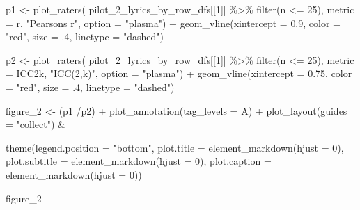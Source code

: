 \documentclass[
  man]{apa7}
\newenvironment{Shaded}{\begin{snugshade}}{\end{snugshade}}
\newcommand{\AttributeTok}[1]{\textcolor[rgb]{0.40,0.45,0.13}{#1}}
\newcommand{\DecValTok}[1]{\textcolor[rgb]{0.68,0.00,0.00}{#1}}
\newcommand{\FloatTok}[1]{\textcolor[rgb]{0.68,0.00,0.00}{#1}}
\newcommand{\FunctionTok}[1]{\textcolor[rgb]{0.28,0.35,0.67}{#1}}
\newcommand{\NormalTok}[1]{\textcolor[rgb]{0.00,0.23,0.31}{#1}}
\newcommand{\OtherTok}[1]{\textcolor[rgb]{0.00,0.23,0.31}{#1}}
\newcommand{\SpecialCharTok}[1]{\textcolor[rgb]{0.37,0.37,0.37}{#1}}
\newcommand{\StringTok}[1]{\textcolor[rgb]{0.13,0.47,0.30}{#1}}
\begin{document}
\begin{Shaded}
\begin{Highlighting}[]
\NormalTok{p1 }\OtherTok{\textless{}{-}} \FunctionTok{plot\_raters}\NormalTok{(}
\NormalTok{  pilot\_2\_lyrics\_by\_row\_dfs[[}\DecValTok{1}\NormalTok{]] }\SpecialCharTok{\%\textgreater{}\%} \FunctionTok{filter}\NormalTok{(n }\SpecialCharTok{\textless{}=} \DecValTok{25}\NormalTok{), }
  \AttributeTok{metric =}\NormalTok{ r, }\StringTok{"Pearson\textquotesingle{}s r"}\NormalTok{, }\AttributeTok{option =} \StringTok{"plasma"}\NormalTok{) }\SpecialCharTok{+} 
  \FunctionTok{geom\_vline}\NormalTok{(}\AttributeTok{xintercept =} \FloatTok{0.9}\NormalTok{, }\AttributeTok{color =} \StringTok{"red"}\NormalTok{, }\AttributeTok{size =}\NormalTok{ .}\DecValTok{4}\NormalTok{, }\AttributeTok{linetype =} \StringTok{"dashed"}\NormalTok{) }

\NormalTok{p2 }\OtherTok{\textless{}{-}} \FunctionTok{plot\_raters}\NormalTok{(}
\NormalTok{  pilot\_2\_lyrics\_by\_row\_dfs[[}\DecValTok{1}\NormalTok{]] }\SpecialCharTok{\%\textgreater{}\%} \FunctionTok{filter}\NormalTok{(n }\SpecialCharTok{\textless{}=} \DecValTok{25}\NormalTok{), }
  \AttributeTok{metric =}\NormalTok{ ICC2k, }\StringTok{"ICC(2,k)"}\NormalTok{, }\AttributeTok{option =} \StringTok{"plasma"}\NormalTok{) }\SpecialCharTok{+}
  \FunctionTok{geom\_vline}\NormalTok{(}\AttributeTok{xintercept =} \FloatTok{0.75}\NormalTok{, }\AttributeTok{color =} \StringTok{"red"}\NormalTok{, }\AttributeTok{size =}\NormalTok{ .}\DecValTok{4}\NormalTok{, }\AttributeTok{linetype =} \StringTok{"dashed"}\NormalTok{) }

\NormalTok{figure\_2 }\OtherTok{\textless{}{-}}\NormalTok{ (p1 }\SpecialCharTok{/}\NormalTok{p2) }\SpecialCharTok{+} 
  \FunctionTok{plot\_annotation}\NormalTok{(}\AttributeTok{tag\_levels =} \StringTok{\textquotesingle{}A\textquotesingle{}}\NormalTok{) }\SpecialCharTok{+}
  \FunctionTok{plot\_layout}\NormalTok{(}\AttributeTok{guides =} \StringTok{"collect"}\NormalTok{) }\SpecialCharTok{\&}
  
  \FunctionTok{theme}\NormalTok{(}\AttributeTok{legend.position =} \StringTok{"bottom"}\NormalTok{,}
        \AttributeTok{plot.title =} \FunctionTok{element\_markdown}\NormalTok{(}\AttributeTok{hjust =} \DecValTok{0}\NormalTok{), }
        \AttributeTok{plot.subtitle =} \FunctionTok{element\_markdown}\NormalTok{(}\AttributeTok{hjust =} \DecValTok{0}\NormalTok{), }
        \AttributeTok{plot.caption =} \FunctionTok{element\_markdown}\NormalTok{(}\AttributeTok{hjust =} \DecValTok{0}\NormalTok{))}

\NormalTok{figure\_2}
\end{Highlighting}
\end{Shaded}
\end{document}

